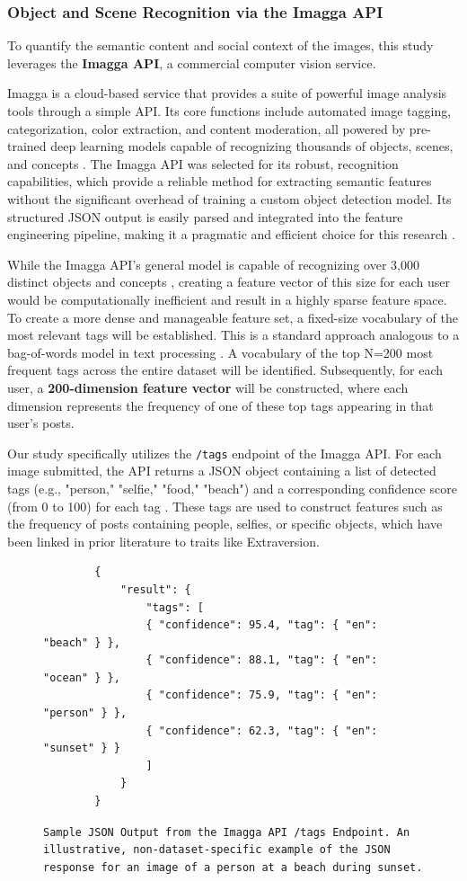 \subsubsection{Object and Scene Recognition via the Imagga API}
To quantify the semantic content and social context of the images, this study leverages the \textbf{Imagga API}, a commercial computer vision service.

Imagga is a cloud-based service that provides a suite of powerful image analysis tools through a simple API. Its core functions include automated image tagging, categorization, color extraction, and content moderation, all powered by pre-trained deep learning models capable of recognizing thousands of objects, scenes, and concepts \citep{imagga_website, imagga_solutions}. The Imagga API was selected for its robust, recognition capabilities, which provide a reliable method for extracting semantic features without the significant overhead of training a custom object detection model. Its structured JSON output is easily parsed and integrated into the feature engineering pipeline, making it a pragmatic and efficient choice for this research \citep{imagga_docs}.

While the Imagga API's general model is capable of recognizing over 3,000 distinct objects and concepts \citep{imagga_solutions}, creating a feature vector of this size for each user would be computationally inefficient and result in a highly sparse feature space. To create a more dense and manageable feature set, a fixed-size vocabulary of the most relevant tags will be established. This is a standard approach analogous to a bag-of-words model in text processing \citep{salton1975}. A vocabulary of the top N=200 most frequent tags across the entire dataset will be identified. Subsequently, for each user, a \textbf{200-dimension feature vector} will be constructed, where each dimension represents the frequency of one of these top tags appearing in that user's posts.

Our study specifically utilizes the \texttt{/tags} endpoint of the Imagga API. For each image submitted, the API returns a JSON object containing a list of detected tags (e.g., "person," "selfie," "food," "beach") and a corresponding confidence score (from 0 to 100) for each tag \citep{imagga_docs}. These tags are used to construct features such as the frequency of posts containing people, selfies, or specific objects, which have been linked in prior literature to traits like Extraversion.

\begin{figure}[H]
	\centering
	\begin{verbatim}
		{
			"result": {
				"tags": [
				{ "confidence": 95.4, "tag": { "en": "beach" } },
				{ "confidence": 88.1, "tag": { "en": "ocean" } },
				{ "confidence": 75.9, "tag": { "en": "person" } },
				{ "confidence": 62.3, "tag": { "en": "sunset" } }
				]
			}
		}
	\end{verbatim}
	\caption{ \texttt{Sample JSON Output from the Imagga API /tags Endpoint. An illustrative, non-dataset-specific example of the JSON response for an image of a person at a beach during sunset.}}
	\label{fig:imagga_json}
\end{figure}


